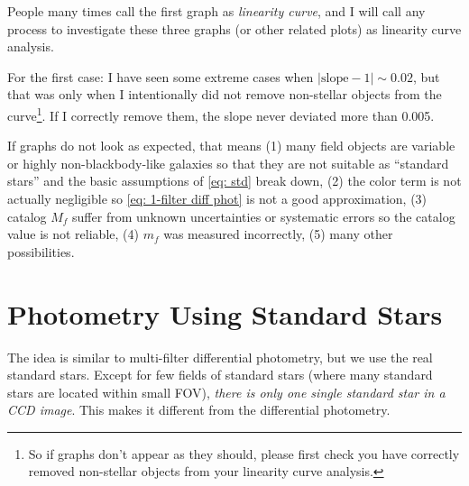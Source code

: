 People many times call the first graph as \emph{linearity curve}, and I will call any process to investigate these three graphs (or other related plots) as linearity curve analysis.

For the first case: I have seen some extreme cases when $ |\mathrm{slope} - 1| \sim 0.02 $, but that was only when I intentionally did not remove non-stellar objects from the curve\footnote{So if graphs don't appear as they should, please first check you have correctly removed non-stellar objects from your linearity curve analysis.}. If I correctly remove them, the slope never deviated more than 0.005.

If graphs do not look as expected, that means (1) many field objects are variable or highly non-blackbody-like galaxies so that they are not suitable as ``standard stars'' and the basic assumptions of \cref{eq: std} break down, (2) the color term is not actually negligible so \cref{eq: 1-filter diff phot} is not a good approximation, (3) catalog $ M_f $ suffer from unknown uncertainties or systematic errors so the catalog value is not reliable, (4) $ m_f $ was measured incorrectly, (5) many other possibilities. 


\section{Photometry Using Standard Stars}
The idea is similar to multi-filter differential photometry, but we use the real standard stars. Except for few fields of standard stars (where many standard stars are located within small FOV), \textit{there is only one single standard star in a CCD image}. This makes it different from the differential photometry.

